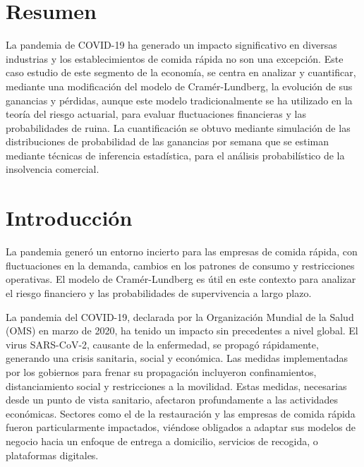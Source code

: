 \documentclass[
  us-letterpaper,
]{scrreprt}
\renewcommand*\contentsname{Tabla de contenidos}
\newcommand\contentsname{Tabla de contenidos}
\theoremstyle{plain}
\theoremstyle{plain}
\theoremstyle{definition}
\theoremstyle{remark}
\begin{document}
\renewcommand*\contentsname{Tabla de contenidos}
{
\hypersetup{linkcolor=}
\setcounter{tocdepth}{2}
\tableofcontents
}


\chapter*{Resumen}\label{resumen}


La pandemia de COVID-19 ha generado un impacto significativo en diversas
industrias y los establecimientos de comida rápida no son una excepción.
Este caso estudio de este segmento de la economía, se centra en analizar
y cuantificar, mediante una modificación del modelo de Cramér-Lundberg,
la evolución de sus ganancias y pérdidas, aunque este modelo
tradicionalmente se ha utilizado en la teoría del riesgo actuarial, para
evaluar fluctuaciones financieras y las probabilidades de ruina. La
cuantificación se obtuvo mediante simulación de las distribuciones de
probabilidad de las ganancias por semana que se estiman mediante
técnicas de inferencia estadística, para el análisis probabilístico de
la insolvencia comercial.


\chapter*{Introducción}\label{introducciuxf3n}


La pandemia generó un entorno incierto para las empresas de comida
rápida, con fluctuaciones en la demanda, cambios en los patrones de
consumo y restricciones operativas. El modelo de Cramér-Lundberg es útil
en este contexto para analizar el riesgo financiero y las probabilidades
de supervivencia a largo plazo.

La pandemia del COVID-19, declarada por la Organización Mundial de la
Salud (OMS) en marzo de 2020, ha tenido un impacto sin precedentes a
nivel global. El virus SARS-CoV-2, causante de la enfermedad, se propagó
rápidamente, generando una crisis sanitaria, social y económica. Las
medidas implementadas por los gobiernos para frenar su propagación
incluyeron confinamientos, distanciamiento social y restricciones a la
movilidad. Estas medidas, necesarias desde un punto de vista sanitario,
afectaron profundamente a las actividades económicas. Sectores como el
de la restauración y las empresas de comida rápida fueron
particularmente impactados, viéndose obligados a adaptar sus modelos de
negocio hacia un enfoque de entrega a domicilio, servicios de recogida,
o plataformas digitales.
\end{document}
